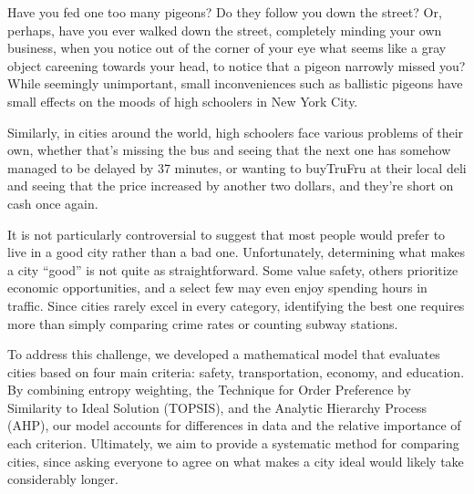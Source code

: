 \documentclass[11pt,letterpaper]{article}
\makeatletter
\renewcommand{\section}{\@startsection{section}{1}{0pt}{2.0ex plus .5ex}{0.8ex}{\normalfont\fontsize{16}{19}\selectfont\bfseries}}
\makeatother
\begin{document}
\endgroup
\clearpage
\section{Introduction}\label{tocentry:1-0}

\par

Have you fed one too many pigeons? Do they follow you down the street? Or, perhaps, have you ever walked down the street, completely minding your own business, when you notice out of the corner of your eye what seems like a gray object careening towards your head, to notice that a pigeon narrowly missed you? While seemingly unimportant, small inconveniences such as ballistic pigeons have small effects on the moods of high schoolers in New York City.

\par

Similarly, in cities around the world, high schoolers face various problems of their own, whether that's missing the bus and seeing that the next one has somehow managed to be delayed by 37 minutes, or wanting to buyTruFru at their local deli and seeing that the price increased by another two dollars, and they're short on cash once again.

\par

It is not particularly controversial to suggest that most people would prefer to live in a good city rather than a bad one. Unfortunately, determining what makes a city ``good'' is not quite as straightforward. Some value safety, others prioritize economic opportunities, and a select few may even enjoy spending hours in traffic. Since cities rarely excel in every category, identifying the best one requires more than simply comparing crime rates or counting subway stations.

\par

To address this challenge, we developed a mathematical model that evaluates cities based on four main criteria: safety, transportation, economy, and education. By combining entropy weighting, the Technique for Order Preference by Similarity to Ideal Solution (TOPSIS), and the Analytic Hierarchy Process (AHP), our model accounts for differences in data and the relative importance of each criterion. Ultimately, we aim to provide a systematic method for comparing cities, since asking everyone to agree on what makes a city ideal would likely take considerably longer.
\end{document}
